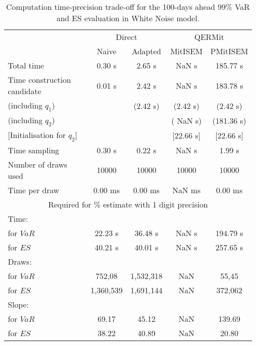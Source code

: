 { \renewcommand{\arraystretch}{1.3} 
\begin{table}[h] 
\centering 
\caption{Computation time-precision trade-off for the 100-days ahead  $99\%$ VaR and ES evaluation in White Noise model.} 
\label{tab:time_precision_WN} 
\begin{tabular}{lcccc}  
  & \multicolumn{2}{c}{Direct} & \multicolumn{2}{c}{QERMit}  \\ \cline{2-5} 
  & Naive & Adapted & MitISEM & PMitISEM  \\ \hline 
Total time & 0.30 s & 2.65 s &  NaN s & 185.77 s \\ 
Time construction candidate & 0.01 s & 2.42 s &  NaN s & 183.78 s \\ 
 (including $q_{1}$) &   &  (2.42 s) & (2.42 s) & (2.42 s) \\ 
 (including $q_{2}$) &   &  & ( NaN s) & (181.36 s) \\ 
$[$Initialisation for $q_{2}$$]$&   &   & $[$22.66 s$]$ & $[$22.66 s$]$ \\ 
Time sampling & 0.30 s & 0.22 s &  NaN s & 1.99 s  \\  
Number of draws used & 10000 & 10000 & 10000 & 10000 \\ 
Time per draw & 0.00 ms & 0.00 ms &  NaN ms & 0.00 ms \\ \hline 
\multicolumn{5}{c}{Required for \% estimate with 1 digit precision} \\ \hline 
Time: &  &  &   &  \\ 
\hspace{1cm} for $VaR$ & 22.23 s & 36.48 s &  NaN s & 194.79 s \\ 
\hspace{1cm} for $ES$ & 40.21 s & 40.01 s &  NaN s & 257.65 s \\ 
Draws: &  &  &   &  \\ 
\hspace{1cm} for $VaR$ & 752,08 & 1,532,318  & NaN  & 55,45  \\ 
\hspace{1cm} for $ES$ & 1,360,539 & 1,691,144  & NaN   & 372,062  \\ 
\hline 
Slope: &  &  &   &  \\ 
\hspace{1cm} for $VaR$ & 69.17 & 45.12  &  NaN  & 139.69  \\ 
\hspace{1cm} for $ES$ & 38.22 & 40.89  &  NaN   & 20.80  \\  \hline 
\end{tabular} 
\end{table} 
} 
